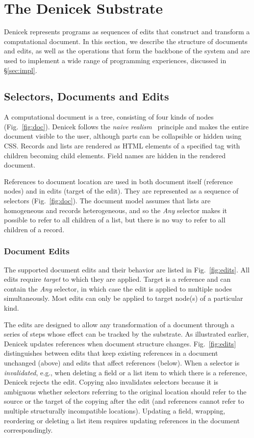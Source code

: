\documentclass[sigconf]{acmart}
\begin{document}
\section{The Denicek Substrate}
\label{sec:system}
Denicek represents programs as sequences of edits that construct and transform a computational
document. In this section, we describe the structure of documents and edits, as well as the
operations that form the backbone of the system and are used to implement a wide range of
programming experiences, discussed in \S\ref{sec:impl}.

\subsection{Selectors, Documents and Edits}
A computational document is a tree, consisting of four kinds of nodes (Fig.~\ref{fig:doc}).
Denicek follows the \emph{naive realism}~\cite{disessa-1986-boxer} principle and makes the entire
document visible to the user, although parts can be collapsible or hidden using CSS.
Records and lists are rendered as HTML elements of a specified tag with children becoming child
elements. Field names are hidden in the rendered document.

References to document location are used in both document itself (reference nodes) and in edits
(target of the edit). They are represented as a sequence of selectors (Fig.~\ref{fig:doc}).
The document model assumes that lists are homogeneous and records heterogeneous, and so the
\textit{Any} selector makes it possible to refer to all children of a list, but there is no
way to refer to all children of a record.

\subsubsection*{Document Edits}
The supported document edits and their behavior are listed in Fig.~\ref{fig:edits}. All edits
require \emph{target} to which they are applied. Target is a reference and can contain the
\textit{Any} selector, in which case the edit is applied to multiple nodes simultaneously.
Most edits can only be applied to target node(s) of a particular kind.

The edits are designed to allow any transformation of a document
through a series of steps whose effect can be tracked by the substrate. As illustrated earlier,
Denicek updates references when document structure changes. Fig.~\ref{fig:edits} distinguishes
between edits that keep existing references in a document unchanged (above) and edits that affect
references (below). When a selector is \emph{invalidated}, e.g., when deleting a field or a
list item to which there is a reference, Denicek rejects the edit. Copying also invalidates
selectors because it is ambiguous whether selectors referring to the original location should
refer to the source or the target of the copying after the edit (and references cannot refer to
multiple structurally incompatible locations). Updating a field, wrapping, reordering or deleting
a list item requires updating references in the document correspondingly.
\end{document}
